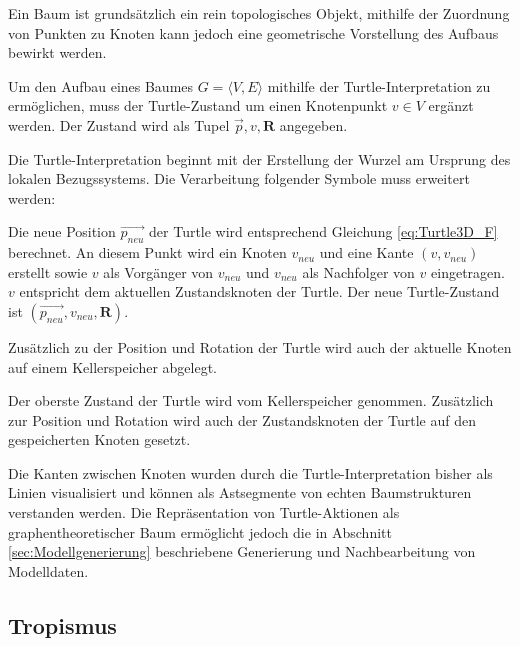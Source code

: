 Ein Baum ist grundsätzlich ein rein topologisches Objekt, mithilfe der Zuordnung von Punkten zu Knoten kann jedoch eine geometrische Vorstellung des Aufbaus bewirkt werden. \cite[S.23]{ABOP:04}

 Um den Aufbau eines Baumes $G = \langle V,E \rangle$ mithilfe der Turtle-Interpretation zu ermöglichen, muss der Turtle-Zustand um einen Knotenpunkt $v \in V$ ergänzt werden. Der Zustand wird als Tupel $\overrightarrow{p}, v, \boldsymbol{R}$ angegeben. 
 
 Die Turtle-Interpretation beginnt mit der Erstellung der Wurzel am Ursprung des lokalen Bezugssystems. Die Verarbeitung folgender Symbole muss erweitert werden:

\begin{description}[labelindent]
		\item[\boldmath$F(l)$]  Die neue Position $\overrightarrow{p_{neu}}$ der Turtle wird entsprechend Gleichung \ref{eq:Turtle3D_F} berechnet. An diesem Punkt wird ein Knoten $v_{neu}$ und eine Kante $(v,v_{neu})$ erstellt sowie $v$ als Vorgänger von $v_{neu}$ und $v_{neu}$ als Nachfolger von $v$ eingetragen. $v$ entspricht dem aktuellen Zustandsknoten der Turtle. Der neue Turtle-Zustand ist $(\overrightarrow{p_{neu}}, v_{neu}, \boldsymbol{R})$.  \\
	
	\item[\boldmath$\textbf{[}$] Zusätzlich zu der Position und Rotation der Turtle wird auch der aktuelle Knoten auf einem Kellerspeicher abgelegt.\\
	
	\item[\boldmath$\textbf{]}$] Der oberste Zustand der Turtle wird vom Kellerspeicher genommen. Zusätzlich zur Position und Rotation wird auch der Zustandsknoten der Turtle auf den gespeicherten Knoten gesetzt.\\
\end{description}

Die Kanten zwischen Knoten wurden durch die Turtle-Interpretation bisher als Linien visualisiert und können als Astsegmente von echten Baumstrukturen verstanden werden. \cite[S.23]{ABOP:04} Die Repräsentation von Turtle-Aktionen als graphentheoretischer Baum ermöglicht jedoch die in Abschnitt \ref{sec:Modellgenerierung} beschriebene Generierung und Nachbearbeitung von Modelldaten.

\subsection{Tropismus}


